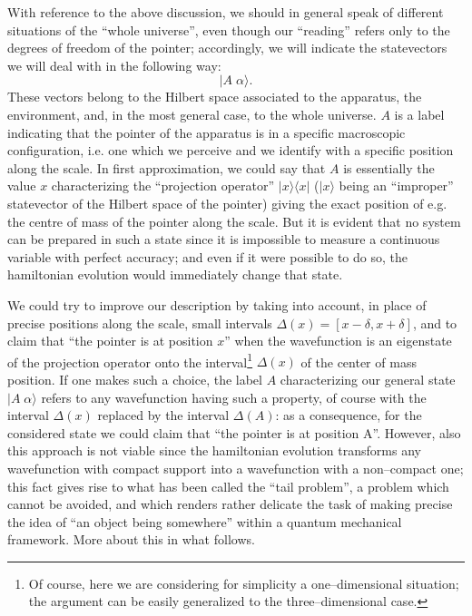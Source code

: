 \documentclass[12pt]{article}
\begin{document}
With reference to the above discussion, we should in general speak
of different situations of the ``whole universe'', even though our
``reading'' refers only to the degrees of freedom of the  pointer;
accordingly, we will indicate the statevectors we will deal with
in the following way:
\[
        |A\; \alpha\rangle.
\]
These vectors belong to the Hilbert space  associated to the
apparatus,  the environment, and, in the most general case, to the
whole universe. $A$ is a label indicating that the pointer of the
apparatus is in a specific macroscopic configuration, i.e. one
which we perceive and we identify with a  specific position along
the scale. In first  approximation, we could say that $A$ is
essentially the value $x$  characterizing the ``projection
operator'' $|x\rangle\langle x|$ ($|x\rangle$ being an
``improper'' statevector of the Hilbert space of the pointer)
giving the exact  position of e.g. the centre of mass of the
pointer along the scale. But it is evident that no system  can be
prepared in such a state since it is impossible to measure a
continuous variable with perfect accuracy; and even if it were
possible to do so, the hamiltonian evolution would immediately
change that state.

We could try to improve our description by taking into account, in
place of precise positions along the scale, small intervals
$\Delta(x) = [ x - \delta, x + \delta ]$, and to claim that ``the
pointer is at position $x$'' when the wavefunction is an
eigenstate of the projection operator onto the
interval\footnote{Of course, here we are considering for
simplicity a one--dimensional situation; the argument can be
easily generalized to the three--dimensional case.} $\Delta(x)$ of
the center  of mass position. If one makes such a choice, the
label $A$ characterizing our general state $|A\; \alpha\rangle$
refers to any wavefunction having  such a property, of course with
the interval $\Delta(x)$ replaced by the interval $\Delta(A)$: as
a consequence, for the considered state we could claim that ``the
pointer is at position A''. However, also this approach is not
viable since the hamiltonian evolution transforms any wavefunction
with compact support into a wavefunction with a non--compact one;
this fact gives rise to what has been called the ``tail problem'',
a problem which cannot be avoided, and which  renders rather
delicate the task of making precise the idea of ``an object being
somewhere'' within a quantum mechanical framework. More about this
in what follows.
\end{document}
